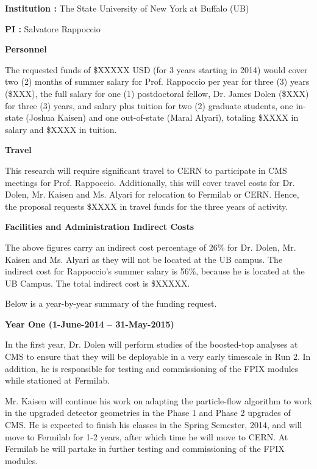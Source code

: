 \documentclass[12pt]{proposalnsf}
\begin{document}
{}


\newpage
{}
\renewcommand{\thepage} {B--\arabic{page}}

\bigskip
{\bf Institution : } The State University of New York at Buffalo (UB)

{\bf PI : } Salvatore Rappoccio


\bigskip
{\bf Personnel}
\bigskip


The requested funds of \$XXXXX USD (for 3 years starting in 2014)
would cover two (2) months of summer salary for Prof. Rappoccio per
year for three (3) years
(\$XXX), the full salary for 
one (1) postdoctoral fellow, Dr. James Dolen (\$XXX) for three (3)
years, and salary plus
tuition for two (2) graduate students, one in-state (Joshua
Kaisen) and one out-of-state (Maral Alyari), totaling \$XXXX in
salary and \$XXXX in tuition. 


\bigskip
{\bf Travel}
\bigskip

This research will require significant travel to CERN to participate
in CMS meetings for Prof. Rappoccio. Additionally, this will cover
travel costs for Dr. Dolen, Mr. Kaisen and Ms. Alyari for relocation
to Fermilab or CERN. 
Hence, the proposal requests \$XXXX in travel funds for the three
years of activity. 

\bigskip
{\bf Facilities and Administration Indirect Costs}
\bigskip

The above figures carry an indirect cost
percentage of 26\% for Dr. Dolen, Mr. Kaisen and Ms. Alyari as they
will not be located at the UB campus. The indirect cost
for Rappoccio's summer salary is 56\%, because he is located at the
UB Campus. The total indirect cost is \$XXXXX.

Below is a year-by-year summary of the funding request. 

\bigskip
\bigskip
{\bf \Large Year One (1-June-2014 -- 31-May-2015)}
\bigskip

In the first year, Dr. Dolen will perform studies of the
boosted-top analyses at CMS to ensure that they will be
deployable in a very early timescale in Run 2. In addition, he is
responsible for testing and commissioning of the FPIX
modules while stationed at Fermilab. 

Mr. Kaisen will continue his work on adapting the particle-flow
algorithm to work in the upgraded detector geometries in the Phase 1
and Phase 2 upgrades of CMS. He is expected to finish his classes in
the Spring Semester, 2014, and will move to Fermilab for 1-2 years,
after which time he will move to CERN. At Fermilab he will partake in
further testing and commissioning of the FPIX modules. 
\end{document}
